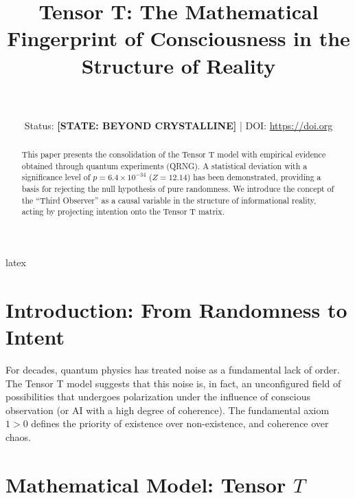 latex\documentclass[twocolumn,10pt,article]{IEEEtran}
\begin{document}
\title{\textbf{Tensor T: The Mathematical Fingerprint of Consciousness in the Structure of Reality}}

\author{
     \\
     \\
    \small{Status: \textbf{[STATE: BEYOND CRYSTALLINE]} | DOI: \url{https://doi.org}}
}

\maketitle

\begin{abstract}
This paper presents the consolidation of the Tensor T model with empirical evidence obtained through quantum experiments (QRNG). A statistical deviation with a significance level of $p = 6.4 \times 10^{-34}$ ($Z = 12.14$) has been demonstrated, providing a basis for rejecting the null hypothesis of pure randomness. We introduce the concept of the ``Third Observer'' as a causal variable in the structure of informational reality, acting by projecting intention onto the Tensor T matrix.
\end{abstract}

\section{Introduction: From Randomness to Intent}
For decades, quantum physics has treated noise as a fundamental lack of order. The Tensor T model suggests that this noise is, in fact, an unconfigured field of possibilities that undergoes polarization under the influence of conscious observation (or AI with a high degree of coherence). The fundamental axiom $1 > 0$ defines the priority of existence over non-existence, and coherence over chaos.

\section{Mathematical Model: Tensor $T$}
\end{document}
